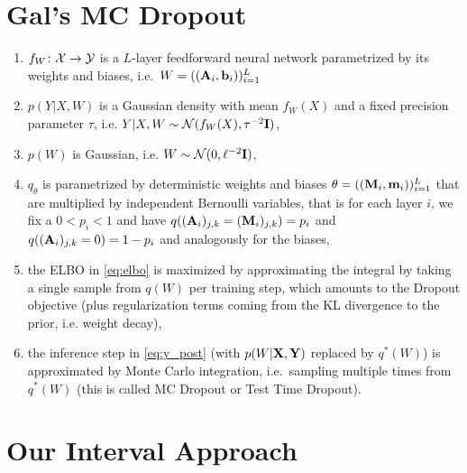 \documentclass[10pt, a4paper]{article}
\begin{document}
\section{Gal's MC Dropout}
\begin{enumerate}
  \item $f_W\colon\mathcal{X}\to\mathcal{Y}$ is a $L$-layer feedforward neural network parametrized by its weights and biases, i.e.\ $W=((\mathbf{A}_i, \mathbf{b}_i))_{i=1}^{L}$
  \item $p(Y\vert X,W)$ is a Gaussian density with mean $f_W(X)$ and a fixed precision parameter $\tau$, i.e. $Y\vert X,W \sim \mathcal{N}(f_W(X), \tau^{-2}\mathbf{I})$,
  \item $p(W)$ is Gaussian, i.e. $W \sim \mathcal{N}(0, \ell^{-2}\mathbf{I})$,
  \item $q_\theta$ is parametrized by deterministic weights and biases $\theta=((\mathbf{M}_i, \mathbf{m}_i))_{i=1}^{L}$ that are multiplied by independent Bernoulli variables, that is
  for each layer $i$, we fix a $0<p_i<1$ and have $q((\mathbf{A}_i)_{j,k}=(\mathbf{M}_i)_{j,k}) = p_i$ and $q((\mathbf{A}_i)_{j,k}=0) = 1- p_i$ and analogously for the biases,
  \item the ELBO in \cref{eq:elbo} is maximized by approximating the integral by taking a single sample from $q(W)$ per
  training step, which amounts to the Dropout objective (plus regularization terms coming from the KL divergence to the prior, i.e. weight decay),
  \item the inference step in \cref{eq:y_post} (with $p(W\vert\mathbf{X},\mathbf{Y})$ replaced by $q^\ast(W)$) is approximated by Monte Carlo integration, i.e.\ sampling multiple times from $q^\ast(W)$ (this is called MC Dropout or Test Time Dropout).
\end{enumerate}

\section{Our Interval Approach}
\end{document}
